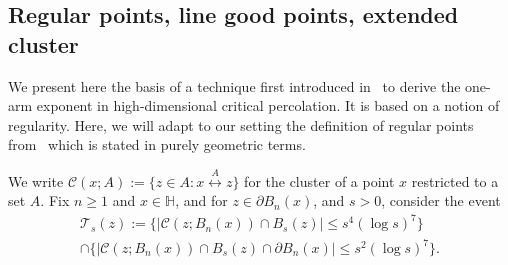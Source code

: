 \documentclass[11pt,a4paper]{article}
\numberwithin{equation}{section}
\theoremstyle{plain}
\theoremstyle{definition}
\begin{document}
 
 \subsection{Regular points, line good points, extended cluster} \label{sec:regularpoints}\label{sec:regularity}
We present here the basis of a technique first introduced in~\cite{KozmaNachmias} to derive the one-arm exponent in high-dimensional critical percolation. It is based on a notion of regularity. 
Here, we will adapt to our setting the definition of regular points from~\cite{Asselah2025capacity} which is stated in purely geometric terms. 

We write $\mathcal C(x;A) := \{z \in A : x \stackrel{A} \longleftrightarrow z\}$ for the cluster of a point $x$ restricted to a set $A$. 
Fix $n\ge 1$ and $x\in \mathbb H$, and for $z\in \partial B_n(x)$, and $s>0$, consider the event   
			\begin{multline}
				\mathcal T_s(z) :=  \{ |\mathcal C(z;B_n(x))\cap B_s(z)| \leq s^4 (\log s)^7\} \\\cap \{|\mathcal C(z;B_n(x))\cap B_s(z)\cap \partial B_n(x)|\leq s^2 (\log s)^7  \}. 
			\end{multline}
\end{document}
